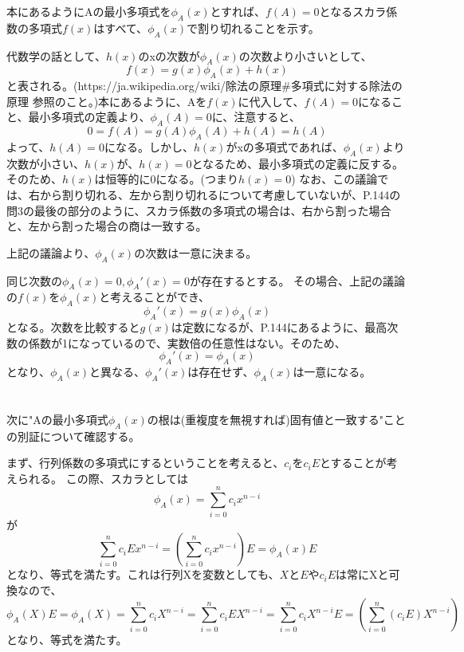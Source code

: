 \documentclass{jsarticle}
\begin{document}
本にあるようにAの最小多項式を$\phi_A(x)$とすれば、$f(A)=0$となるスカラ係数の多項式$f(x)$はすべて、$\phi_A(x)$で割り切れることを示す。

代数学の話として、$h(x)$のxの次数が$\phi_A(x)$の次数より小さいとして、
\begin{equation}
\label{a}
f(x) = g(x)\phi_A(x) + h(x)
\end{equation}
と表される。(https://ja.wikipedia.org/wiki/除法の原理\#多項式に対する除法の原理 参照のこと。)本にあるように、Aを$f(x)$に代入して、$f(A)=0$になること、最小多項式の定義より、$\phi_A(A) = 0$に、注意すると、
\begin{equation}
0 = f(A) = g(A)\phi_A(A) + h(A) = h(A)
\end{equation}
よって、$h(A) = 0$になる。しかし、$h(x)$がxの多項式であれば、$\phi_A(x)$より次数が小さい、$h(x)$が、$h(x)=0$となるため、最小多項式の定義に反する。そのため、$h(x)$は恒等的に0になる。(つまり$h(x) = 0$)
なお、この議論では、右から割り切れる、左から割り切れるについて考慮していないが、P.144の問3の最後の部分のように、スカラ係数の多項式の場合は、右から割った場合と、左から割った場合の商は一致する。

上記の議論より、$\phi_A(x)$の次数は一意に決まる。

同じ次数の$\phi_A(x) = 0, {\phi_A}'(x) = 0$が存在するとする。
その場合、上記の議論の$f(x)$を${\phi_A}(x)$と考えることができ、
\begin{equation}
{\phi_A}'(x) = g(x)\phi_A(x)
\end{equation}
となる。次数を比較すると$g(x)$は定数になるが、P.144にあるように、最高次数の係数が1になっているので、実数倍の任意性はない。そのため、
\begin{equation}
{\phi_A}'(x) = \phi_A(x)
\end{equation}
となり、$\phi_A(x)$と異なる、${\phi_A}'(x)$は存在せず、$\phi_A(x)$は一意になる。
\\
\\
\\
次に"Aの最小多項式$\phi_A(x)$の根は(重複度を無視すれば)固有値と一致する"ことの別証について確認する。

まず、行列係数の多項式にするということを考えると、$c_i$を$c_iE$とすることが考えられる。
この際、スカラとしては
\begin{equation}
\phi_A(x) = \sum_{i=0}^n c_i x^{n-i}
\end{equation}
が
\begin{equation}
\sum_{i=0}^n c_iE x^{n-i} = (\sum_{i=0}^n c_i x^{n-i}) E = \phi_A(x)E
\end{equation}
となり、等式を満たす。これは行列Xを変数としても、$X$と$E$や$c_i E$は常にXと可換なので、
\begin{equation}
\phi_A(X)E = \phi_A(X) = \sum_{i=0}^n c_i X^{n-i} = \sum_{i=0}^n c_i E X^{n-i} = \sum_{i=0}^n c_i X^{n-i} E = (\sum_{i=0}^n (c_i E) X^{n-i})
\end{equation}
となり、等式を満たす。
\end{document}

